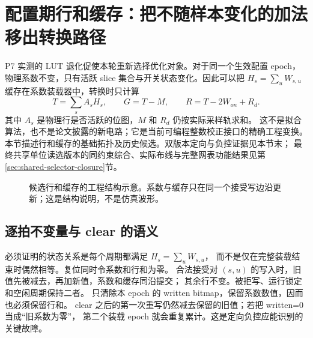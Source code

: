 \section{配置期行和缓存：把不随样本变化的加法移出转换路径}
\label{sec:row-cache}
P7 实测的 LUT 退化促使本轮重新选择优化对象。对于同一个生效配置 epoch，
物理系数不变，只有活跃 slice 集合与开关状态变化。因此可以把
\(H_s=\sum_u W_{s,u}\) 缓存在系数装载器中，转换时只计算
\begin{equation}
T=\sum_s A_s H_s,\qquad
G=T-M,\qquad R=T-2W_{on}+R_d.
\end{equation}
其中 \(A_s\) 是物理行是否活跃的位图，\(M\) 和 \(R_d\) 仍按实际采样轨求和。
这不是拟合算法，也不是论文披露的新电路；它是当前可编程整数校正接口的精确工程变换。
本节描述行和缓存的基础拓扑及历史候选。双版本定向与负控证据见本节末；
最终共享单位读选版本的同约束综合、实际布线与完整网表功能结果见第\ref{sec:shared-selector-closure}节。

\begin{figure}[H]\centering
{}
\caption{候选行和缓存的工程结构示意。系数与缓存只在同一个接受写边沿更新；这是结构说明，不是仿真波形。}
\end{figure}

\subsection{逐拍不变量与 clear 的语义}
必须证明的状态关系是每个周期都满足 \(H_s=\sum_u W_{s,u}\)，
而不是仅在完整装载结束时偶然相等。复位同时令系数和行和为零。
合法接受对 \((s,u)\) 的写入时，旧值先被减去，再加新值，系数和缓存同沿提交；
其余行不变。被拒写、运行锁定和空闲周期保持二者。
 只清除本 epoch 的 written bitmap，保留系数数值，因而也必须保留行和。
clear 之后的第一次重写仍然减去保留的旧值；若把 written=0 当成“旧系数为零”，
第二个装载 epoch 就会重复累计。这是定向负控应能识别的关键故障。

